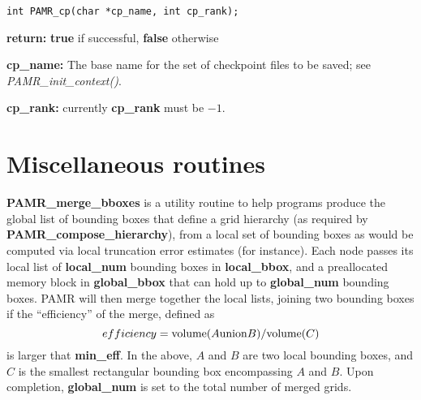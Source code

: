 \documentclass[aps,amssymb,unsortedaddress,nofootinbib]{revtex4}
\def\lsep{\itemsep 0.05in}
\begin{document}
\begin{verbatim}
int PAMR_cp(char *cp_name, int cp_rank);
\end{verbatim}
\begin{list}{}{\lsep}
\item {\bf return:} {\bf true} if successful, {\bf false} otherwise
\item {\bf *cp\_name:} The base name for the set of checkpoint files to
be saved; see {\em PAMR\_init\_context()}.
\item {\bf cp\_rank:} currently {\bf cp\_rank} must be $-1$.
\end{list}


\section{Miscellaneous routines}


{\bf PAMR\_merge\_bboxes} is a utility routine to help programs produce the global list
of bounding boxes that define a grid hierarchy (as required by {\bf PAMR\_compose\_hierarchy}),
from a local set of bounding boxes as would be computed via local truncation error estimates
(for instance). Each node passes its local list of {\bf local\_num} bounding boxes in
{\bf local\_bbox}, and a preallocated memory block in {\bf global\_bbox} that can hold up
to {\bf global\_num} bounding boxes. PAMR will then merge together the local lists, joining
two bounding boxes if the ``efficiency'' of the merge, defined as
\begin{equation}
efficiency = {\rm volume}(A {\rm union} B)/{\rm volume}(C)
\end{equation}
is larger that {\bf min\_eff}. In the above, $A$ and $B$ are two local bounding boxes, and $C$ 
is the smallest rectangular bounding box encompassing $A$ and $B$.
Upon completion, {\bf global\_num} is set to the total number of merged grids.
\end{document}
